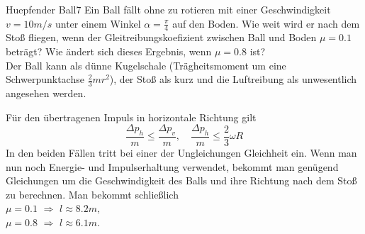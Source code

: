 \begin{problem}{Huepfender Ball}{7}
Ein Ball fällt ohne zu rotieren mit einer Geschwindigkeit $v=10 \unit{m/s}$ unter einem Winkel $\alpha = \frac\pi4$ auf den Boden. Wie weit wird er nach dem Stoß fliegen, wenn der Gleitreibungskoefizient zwischen Ball und Boden $\mu = 0.1$ beträgt? Wie ändert sich dieses Ergebnis, wenn $\mu = 0.8$ ist?\\
\hinweis Der Ball kann als dünne Kugelschale (Trägheitsmoment um eine Schwerpunktachse $\frac23 m r^2$), der Stoß als kurz und die Luftreibung als unwesentlich angesehen werden.
\begin{solution}
Für den übertragenen Impuls in horizontale Richtung gilt
\[
\frac{\Delta p_h}{m} \leq \frac{\Delta p_v}{m}, \quad \frac{\Delta p_h}{m} \leq \frac23 \omega R
\]
In den beiden Fällen tritt bei einer der Ungleichungen Gleichheit ein. Wenn man nun noch Energie- und Impulserhaltung verwendet, bekommt man genügend Gleichungen um die Geschwindigkeit des Balls und ihre Richtung nach dem Stoß zu berechnen. Man bekommt schließlich\\
$\mu = 0.1$ $\Rightarrow$ $l \approx 8.2 \unit{m},$\\
$\mu = 0.8$ $\Rightarrow$ $l \approx 6.1 \unit{m}.$
\end{solution}
\end{problem}


